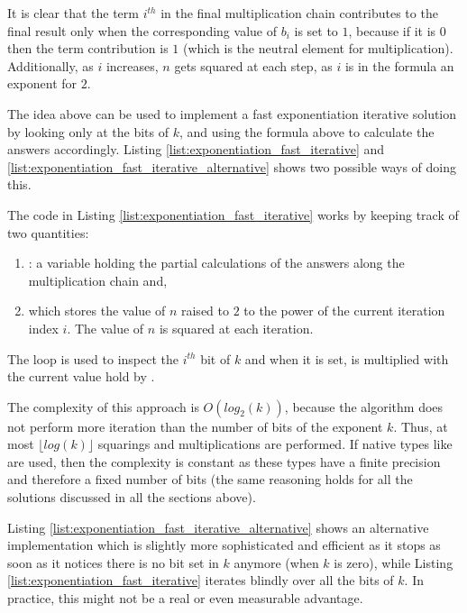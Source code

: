 It is clear that the term $i^{th}$ in the final multiplication chain contributes to the final result only when the corresponding value of $b_i$ is set to $1$, because if it is $0$ then the term contribution is $1$ (which is the neutral element for multiplication).
Additionally, as $i$ increases, $n$ gets squared at each step, as $i$ is in the formula an exponent for $2$. 


The idea above can be used to implement
a fast exponentiation iterative solution by looking only at the bits of $k$, and using the formula above to calculate the answers accordingly.
Listing \ref{list:exponentiation_fast_iterative} and \ref{list:exponentiation_fast_iterative_alternative} shows two  possible ways of doing this.




The code in Listing \ref{list:exponentiation_fast_iterative}  works by keeping track of two quantities:
\begin{enumerate}
    \item {}: a variable holding the partial calculations of the answers along the multiplication chain and, 
    \item {} which stores the value of $n$ raised to $2$ to the power of the current iteration index $i$. The value of $n$ is squared at each iteration.
\end{enumerate}
The loop is used to inspect the $i^{th}$ bit of $k$ and when it is set,  is multiplied with the current value hold by . 


The complexity of this approach is $O(log_2(k))$, because the algorithm does not perform more iteration than the number of bits of the exponent $k$.
Thus, at most $\lfloor log(k) \rfloor$ squarings and multiplications are performed.
If native types like  are used, then the complexity is constant as these types have a finite precision and therefore a fixed number of bits (the same reasoning holds for all the solutions discussed in all the sections above). 

Listing \ref{list:exponentiation_fast_iterative_alternative} shows an alternative implementation which is slightly more sophisticated and efficient as it stops as soon as it notices there is no bit set in $k$ anymore (when $k$ is zero),  while Listing \ref{list:exponentiation_fast_iterative} iterates blindly over all the bits of $k$.
In practice, this might not be a real or even measurable advantage.

